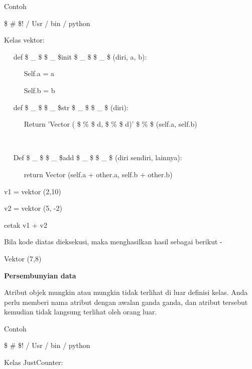 \begin{12pt}
\begin{12pt}
\begin{12pt}
\begin{12pt}
\begin{12pt}
\begin{12pt}
\begin{12pt}
\begin{12pt}
\begin{12pt}
\begin{12pt}
\begin{12pt}
\begin{12pt}
\begin{12pt}
\begin{12pt}
\begin{12pt}
\begin{12pt}
\begin{12pt}
\begin{12pt}
\begin{12pt}
Contoh \par
\vspace{12pt}
\noindent 
 \$  \#  \$! / Usr / bin / python \par
\vspace{12pt}
\noindent 
Kelas vektor: \par
\noindent 
~~ def  \$  \_  \$ \$  \_  \$init  \$  \_  \$ \$  \_  \$ (diri, a, b): \par
\noindent 
~~~~~ Self.a = a \par
\noindent 
~~~~~ Self.b = b \par
\vspace{12pt}
\noindent 
~~ def  \$  \_  \$ \$  \_  \$str  \$  \_  \$ \$  \_  \$ (diri): \par
\noindent 
~~~~~ Return 'Vector ( \$  \%  \$ d, \$  \%  \$ d)' \$  \%  \$ (self.a, self.b) \par
\noindent 
~~  \par
\noindent 
~~ Def  \$  \_  \$ \$  \_  \$add  \$  \_  \$ \$  \_  \$ (diri sendiri, lainnya): \par
\noindent 
~~~~~ return Vector (self.a + other.a, self.b + other.b) \par
\vspace{12pt}
\noindent 
v1 = vektor (2,10) \par
\noindent 
v2 = vektor (5, -2) \par
\noindent 
cetak v1 + v2 \par
\vspace{12pt}
\noindent 
Bila kode diatas dieksekusi, maka menghasilkan hasil sebagai berikut - \par
\vspace{12pt}
\noindent 
Vektor (7,8) \par
\vspace{12pt}
\noindent 
{\fontsize{14pt}{14pt}\selectfont \textbf{Persembunyian data} \\} \par
\vspace{12pt}
Atribut objek mungkin atau mungkin tidak terlihat di luar definisi kelas. Anda perlu memberi nama atribut dengan awalan ganda ganda, dan atribut tersebut kemudian tidak langsung terlihat oleh orang luar. \par
Contoh \par
\vspace{12pt}
\noindent 
 \$  \#  \$! / Usr / bin / python \par
\vspace{12pt}
\noindent 
Kelas JustCounter: \par

\end{12pt}
\end{12pt}
\end{12pt}
\end{12pt}
\end{12pt}
\end{12pt}
\end{12pt}
\end{12pt}
\end{12pt}
\end{12pt}
\end{12pt}
\end{12pt}
\end{12pt}
\end{12pt}
\end{12pt}
\end{12pt}
\end{12pt}
\end{12pt}
\end{12pt}
